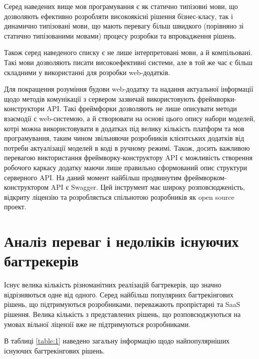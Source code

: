 \documentclass[../main.tex]{subfiles}
\begin{document}
Серед наведених вище мов програмування є як статично типізовні мови, що дозволяють ефективно розробляти високоякісні рішення бізнес-класу, так і динамично типізовані мови, що мають перевагу більш швидкого (порівняно зі статично типізованими мовами) процесу розробки та впровадження рішень.

Також серед наведеного списку є не лише інтерпретовані мови, а й компільовані. Такі мови дозволяють писати високоефективні системи, але в той же час є більш складними у використанні для розробки web-додатків.

Для покращення розуміння будови web-додатку та надання актуальної інформації щодо методів комунікації з сервером зазвичай використовують фреймворки-конструктори API. Такі фреймфорки дозволяють не лише описувати методи взаємодії с web-системою, а й створювати на основі цього опису набори моделей, котрі можна використовувати в додатках під велику кількість платформ та мов програмування, таким чином звільняючи розробників клієнтських додатків від потреби актуалізації моделей в коді в ручному режимі. Також, досить важливою перевагою виктористання фреймворку-конструктору API є можливість створення робочого каркасу додатку маючи лише правильно сформований опис структури серверного API. На даний момент найбільш продвинутим фреймворком-конструктором API є Swagger. Цей інструмент має широку розповсюдженість, відкриту ліцензію та розробляється спільнотою розробників як open source проект.

\section{Аналіз переваг і недоліків існуючих багтрекерів}

Існує велика кількість різноманітних реалізацій багтрекерів, що значно відрізняються одне від одного. Серед найбільш популярних багтрекінгових рішень, що підтримуються розробниками, переважають пропрієтарні та SaaS рішення. Велика кількість з представлених рішень, що розповсюджуються на умовах вільної ліцензії вже не підтримуються розробниками.

В таблиці \ref{table:1} наведено загальну інформацію щодо найпопулярніших існуючих багтрекінгових рішень.
\end{document}
